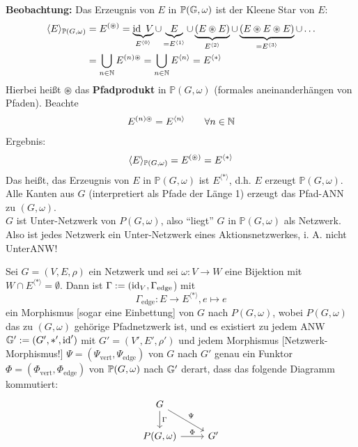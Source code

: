 \textbf{Beobachtung:} Das Erzeugnis von $E$ in $\mathbb{P}(\G,\omega)$ ist der Kleene Star von $E$:
\begin{align*}
    \langle E\rangle_{\mathbb{P}(G,\omega)}
    &=E^{(\circledast)}
    =\underbrace{\id~V}_{E^{\langle0\rangle}}\cup \underbrace{E}_{=E^{\langle1\rangle}}\cup \underbrace{(E\circledast E)}_{E^{\langle2\rangle}}\cup\underbrace{(E\circledast E\circledast E)}_{=E^{\langle3\rangle}}\cup\ldots\\
    &=\bigcup\limits_{n\in\N} E^{(n)\circledast}
    =\bigcup\limits_{n\in\N} E^{\langle n\rangle}
    =E^{\langle\ast\rangle}
\end{align*}
Hierbei heißt $\circledast$ das \textbf{Pfadprodukt} in $\mathbb{P}(G,\omega)$ (formales aneinanderhängen von Pfaden). Beachte
\begin{align*}
    E^{(n)\circledast}=E^{\langle n\rangle}\qquad\forall n\in\N
\end{align*}
Ergebnis:
\begin{align*}
    \langle E\rangle_{\P(G,\omega)}=E^{(\circledast)}=E^{\langle\ast\rangle}
\end{align*}
Das heißt, das Erzeugnis von $E$ in $\mathbb{P}(G,\omega)$ ist $E^{\langle\ast\rangle}$, d.h. $E$ erzeugt $\mathbb{P}(G,\omega)$.\\
Alle Kanten aus $G$ (interpretiert als Pfade der Länge 1) erzeugt das Pfad-ANN zu $(G,\omega)$.\\
$G$ ist Unter-Netzwerk von $P(G,\omega)$, also ``liegt'' $G$ in $\mathbb{P}(G,\omega)$ als Netzwerk.\\
Also ist jedes Netzwerk ein Unter-Netzwerk eines Aktionsnetzwerkes, i. A. nicht UnterANW!

\begin{proposition}
    Sei $G=(V,E,\rho)$ ein Netzwerk und sei $\omega: V \to W$ eine Bijektion mit $W \cap E^{\langle\ast\rangle} = \emptyset$.
    Dann ist $\Gamma := (\id_V, \Gamma_{\text{edge}}$) mit 
    $$ \Gamma_{\text{edge}}: E \to E^{\langle\ast\rangle}, e \mapsto e $$ ein Morphismus [sogar eine Einbettung] von $G$ nach $P(G,\omega)$, wobei
    $P(G,\omega)$ das zu $(G,\omega)$ gehörige Pfadnetzwerk ist, und es existiert zu jedem ANW $\G':=(G',\ast',\id')$ mit
    $G'=(V',E',\rho')$ und jedem Morphismus [Netzwerk-Morphismus!]
    $ \Psi = (\Psi_{\text{vert}}, \Psi_{\text{edge}})$ von $G$ nach $G'$ genau ein Funktor $\Phi=(\Phi_{\text{vert}},\Phi_{\text{edge}})$ von 
    $\P(G,\omega)$ nach $\G'$ derart, dass das folgende Diagramm kommutiert:
    $$ \begin{tikzcd}
        \dar{\Gamma}G\drar{\Psi} &\\
        P(G,\omega) \rar{\Phi} & G'
    \end{tikzcd}$$
\end{proposition}


